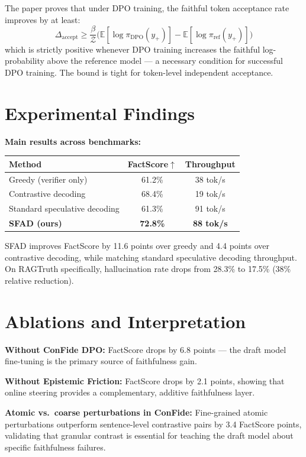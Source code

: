 \documentclass[10pt,twocolumn]{article}
\begin{document}
The paper proves that under DPO training, the faithful token acceptance
rate improves by at least:
\[
  \Delta_\mathrm{accept} \geq
  \frac{\beta}{\mathcal{Z}} \bigl(\mathbb{E}[\log \pi_\mathrm{DPO}(y_+)]
  - \mathbb{E}[\log \pi_\mathrm{ref}(y_+)]\bigr)
\]
which is strictly positive whenever DPO training increases the faithful
log-probability above the reference model --- a necessary condition for
successful DPO training. The bound is tight for token-level independent
acceptance.

\section{Experimental Findings}

\textbf{Main results across benchmarks:}

\begin{center}
\begin{tabular}{lcc}
\toprule
Method & FactScore$\uparrow$ & Throughput \\
\midrule
Greedy (verifier only)         & 61.2\% & 38 tok/s \\
Contrastive decoding           & 68.4\% & 19 tok/s \\
Standard speculative decoding  & 61.3\% & 91 tok/s \\
\textbf{SFAD (ours)}           & \textbf{72.8\%} & \textbf{88 tok/s} \\
\bottomrule
\end{tabular}
\end{center}

SFAD improves FactScore by 11.6 points over greedy and 4.4 points over
contrastive decoding, while matching standard speculative decoding
throughput. On RAGTruth specifically, hallucination rate drops from
28.3\% to 17.5\% (38\% relative reduction).

\section{Ablations and Interpretation}

\textbf{Without ConFide DPO:} FactScore drops by 6.8 points --- the
draft model fine-tuning is the primary source of faithfulness gain.

\textbf{Without Epistemic Friction:} FactScore drops by 2.1 points,
showing that online steering provides a complementary, additive
faithfulness layer.

\textbf{Atomic vs.\ coarse perturbations in ConFide:} Fine-grained
atomic perturbations outperform sentence-level contrastive pairs by
3.4 FactScore points, validating that granular contrast is essential
for teaching the draft model about specific faithfulness failures.
\end{document}
